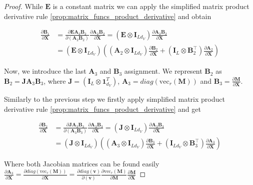 \documentclass{article}
\begin{document}
\begin{proof}
While $\mathbf{E}$ is a constant matrix we can apply the simplified matrix product derivative rule \ref{prop:matrix_funcs_product_derivative} and obtain

\begin{align*}
    \frac{\partial \mathbf{B}_1}{\partial \mathbf{X}} &= \frac{\partial \mathbf{E} \mathbf{A}_2 \mathbf{B}_2}{\partial (\mathbf{A}_2 \mathbf{B}_2)} \frac{\partial \mathbf{A}_2 \mathbf{B}_2}{\partial \mathbf{X}} = \left( \mathbf{E} \otimes \mathbf{I}_{L d_V}\right)\frac{\partial \mathbf{A}_2 \mathbf{B}_2}{\partial \mathbf{X}} \\
    &= \left( \mathbf{E} \otimes \mathbf{I}_{L d_V}\right) \left( (\mathbf{A}_2\otimes \mathbf{I}_{L d_V} )\frac{\partial \mathbf{B}_2}{\partial \mathbf{X}} + (\mathbf{I}_L \otimes \mathbf{B}_2^\top) \frac{\partial \mathbf{A}_2}{\partial \mathbf{X}}\right)
\end{align*}

Now, we introduce the last $\mathbf{A}_3$ and $\mathbf{B}_3$ assignment. We represent $\mathbf{B}_2$ as $\mathbf{B}_2 = \mathbf{J} \mathbf{A}_3 \mathbf{B}_3$, where $\mathbf{J} = (\mathbf{I}_L \otimes \mathbf{1}^T_{d_V})$, $\mathbf{A}_3 = \textit{diag}(\mathrm{vec}_r (\mathbf{M}))$ and $\mathbf{B}_3 = \frac{\partial \mathbf{M}}{\partial \mathbf{X}}$.

Similarly to the previous step we firstly apply simplified matrix product derivative rule \ref{prop:matrix_funcs_product_derivative} and get

\begin{align*}
    \frac{\partial \mathbf{B}_2}{\partial \mathbf{X}} &= \frac{\partial \mathbf{J} \mathbf{A}_3 \mathbf{B}_3}{\partial (\mathbf{A}_3 \mathbf{B}_3)} \frac{\partial \mathbf{A}_3 \mathbf{B}_3}{\partial \mathbf{X}} = \left( \mathbf{J} \otimes \mathbf{I}_{L d_V}\right)\frac{\partial \mathbf{A}_3 \mathbf{B}_3}{\partial \mathbf{X}} \\
    &= \left( \mathbf{J} \otimes \mathbf{I}_{L d_V}\right) \left((\mathbf{A}_3 \otimes \mathbf{I}_{Ld_V} ) \frac{\partial \mathbf{B}_3}{\partial \mathbf{X}} + ( \mathbf{I}_{Ld_V} \otimes \mathbf{B}_3^\top)\frac{\partial\mathbf{A}_3}{\partial \mathbf{X}}\right)
\end{align*}

Where both Jacobian matrices can be found easily $\frac{\partial\mathbf{A}_3}{\partial \mathbf{X}} = \frac{\partial \textit{diag}(\mathrm{vec}_r(\mathbf{M}))}{\partial \mathbf{X}} = \frac{\partial \textit{diag}(\mathbf{v})}{\partial (\mathbf{v})} \frac{\partial \mathrm{vec}_r(\mathbf{M})}{\partial \mathbf{M}} \frac{\partial \mathbf{M}}{\partial \mathbf{X}}$


\end{proof}
\end{document}
